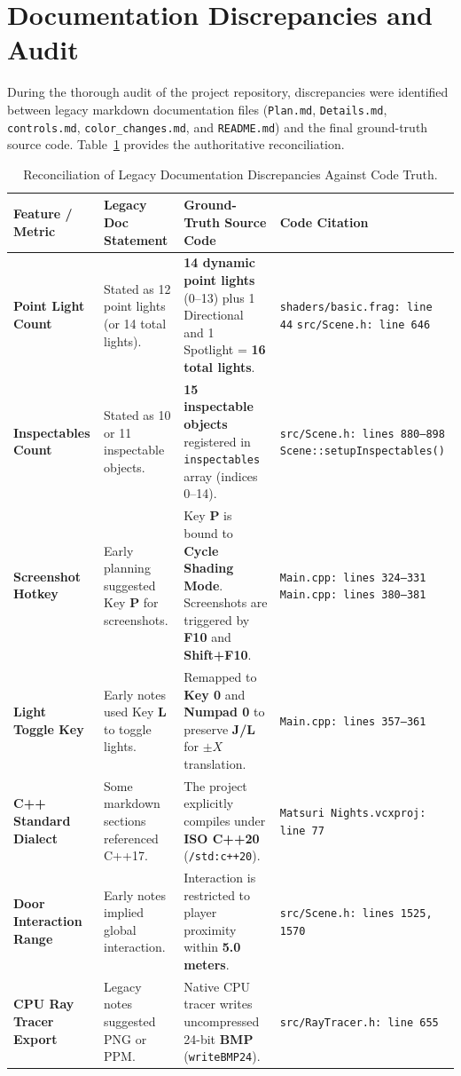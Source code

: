 \section{Documentation Discrepancies and Audit}
During the thorough audit of the project repository, discrepancies were identified between legacy markdown documentation files (\texttt{Plan.md}, \texttt{Details.md}, \texttt{controls.md}, \texttt{color\_changes.md}, and \texttt{README.md}) and the final ground-truth source code. Table~\ref{tab:doc_discrepancies} provides the authoritative reconciliation.

\begin{table}[htbp]
\centering
\footnotesize
\renewcommand{\arraystretch}{0.92}
\begin{tabularx}{\textwidth}{p{3.0cm} p{3.8cm} p{4.2cm} p{3.4cm}}
\toprule
\textbf{Feature / Metric} & \textbf{Legacy Doc Statement} & \textbf{Ground-Truth Source Code} & \textbf{Code Citation} \\
\midrule
\textbf{Point Light Count} &
Stated as 12 point lights (or 14 total lights). &
\textbf{14 dynamic point lights} (0--13) plus 1 Directional and 1 Spotlight = \textbf{16 total lights}. &
\texttt{shaders/basic.frag: line 44} \newline
\texttt{src/Scene.h: line 646} \\
\addlinespace
\textbf{Inspectables Count} &
Stated as 10 or 11 inspectable objects. &
\textbf{15 inspectable objects} registered in \texttt{inspectables} array (indices 0--14). &
\texttt{src/Scene.h: lines 880--898} \newline
\texttt{Scene::setupInspectables()} \\
\addlinespace
\textbf{Screenshot Hotkey} &
Early planning suggested Key \textbf{P} for screenshots. &
Key \textbf{P} is bound to \textbf{Cycle Shading Mode}. Screenshots are triggered by \textbf{F10} and \textbf{Shift+F10}. &
\texttt{Main.cpp: lines 324--331} \newline
\texttt{Main.cpp: lines 380--381} \\
\addlinespace
\textbf{Light Toggle Key} &
Early notes used Key \textbf{L} to toggle lights. &
Remapped to \textbf{Key 0} and \textbf{Numpad 0} to preserve \textbf{J/L} for $\pm X$ translation. &
\texttt{Main.cpp: lines 357--361} \\
\addlinespace
\textbf{C++ Standard Dialect} &
Some markdown sections referenced C++17. &
The project explicitly compiles under \textbf{ISO C++20} (\texttt{/std:c++20}). &
\texttt{Matsuri Nights.vcxproj: line 77} \\
\addlinespace
\textbf{Door Interaction Range} &
Early notes implied global interaction. &
Interaction is restricted to player proximity within \textbf{5.0 meters}. &
\texttt{src/Scene.h: lines 1525, 1570} \\
\addlinespace
\textbf{CPU Ray Tracer Export} &
Legacy notes suggested PNG or PPM. &
Native CPU tracer writes uncompressed 24-bit \textbf{BMP} (\texttt{writeBMP24}). &
\texttt{src/RayTracer.h: line 655} \\
\bottomrule
\end{tabularx}
\caption{Reconciliation of Legacy Documentation Discrepancies Against Code Truth.}
\label{tab:doc_discrepancies}
\end{table}
